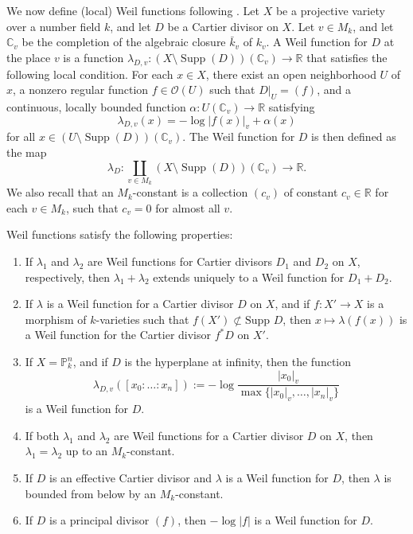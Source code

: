 \documentclass[10pt]{amsart}
\numberwithin{equation}{section}
\theoremstyle{plain}
\theoremstyle{definition}
\DeclareMathOperator{\Supp}{Supp}
\begin{document}
 We now define (local) Weil functions following \cite[Section 9]{VojtaBook}. Let $X$ be a projective variety over a number field $k$, and let $D$ be a Cartier divisor on $X$. Let $v \in M_k$, and let $\mathbb{C}_v$ be the completion of the algebraic closure $\bar{k}_v$ of $k_v$. A Weil function for $D$ at the place $v$ is a function $\lambda_{D,v}: (X \setminus \Supp(D))(\mathbb{C}_v) \to \mathbb{R}$ that satisfies the following local condition. For each $x \in X$, there exist an open neighborhood $U$ of $x$, a nonzero regular function $f \in \mathcal{O}(U)$ such that $D|_U=(f)$, and a continuous, locally bounded function $\alpha: U(\mathbb{C}_v) \to \mathbb{R}$ satisfying
\begin{equation*}
    \lambda_{D,v}(x) = -\log|f(x)|_v + \alpha(x)
\end{equation*}
for all $x \in (U\setminus \Supp(D))(\mathbb{C}_v)$. 
The Weil function for $D$ is then defined as the map
\[ \lambda_D: \coprod_{v\in M_k} (X\setminus \Supp(D))(\mathbb{C}_v) \to \mathbb{R}. \]
We also recall that  an $M_k$-constant is a collection $(c_v)$ of constant $c_v\in\mathbb R$ for each $v\in M_k$, such that $c_v=0$ for almost all $v$.


Weil functions satisfy the following properties:

\begin{enumerate}
     \item[(a)] If $\lambda_1$ and $\lambda_2$ are Weil functions for Cartier divisors $D_1$ and $D_2$ on $X$, respectively, then $\lambda_1 + \lambda_2$ extends uniquely to a Weil function for $D_1 + D_2$.
    
    \item[(b)] If $\lambda$ is a Weil function for a Cartier divisor $D$ on $X$, and if $f : X' \to X$ is a morphism of $k$-varieties such that $f(X') \not\subset \text{Supp } D$, then $x \mapsto \lambda(f(x))$ is a Weil function for the Cartier divisor $f^*D$ on $X'$.
    
    \item[(c)] If $X = \mathbb{P}^n_k$, and if $D$ is the hyperplane at infinity, then the function
    \begin{equation*}
        \lambda_{D,v}([x_0 : \dots : x_n]) := -\log \frac{|x_0|_v}{\max\{|x_0|_v, \dots, |x_n|_v\}}
    \end{equation*}
    is a Weil function for $D$.
    
    \item[(d)] If both $\lambda_1$ and $\lambda_2$ are Weil functions for a Cartier divisor $D$ on $X$, then $\lambda_1 = \lambda_2 $ up to an $M_k$-constant.
    
    \item[(e)] If $D$ is an effective Cartier divisor and $\lambda$ is a Weil function for $D$, then $\lambda$ is bounded from below by an $M_k$-constant.
    
    \item[(f)] If $D$ is a principal divisor $(f)$, then $-\log |f|$ is a Weil function for $D$.
\end{enumerate}
\end{document}
